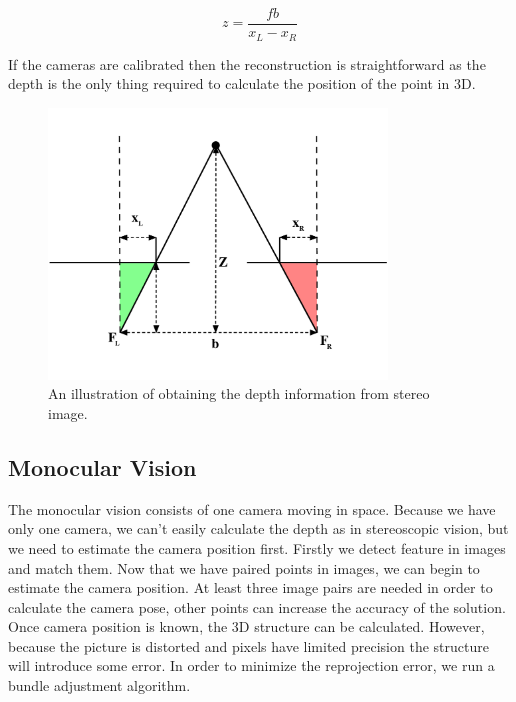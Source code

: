 \begin{equation}
	z=\frac{f b}{x_L - x_R}
\end{equation}

If the cameras are calibrated then the reconstruction is straightforward as the depth is the only thing required to calculate the position of the point in 3D.

\begin{figure}[ht]
	\begin{center}
		\includegraphics[keepaspectratio,width=9cm]{fig/stereo.pdf}
	\end{center}
	\caption{An illustration of obtaining the depth information from stereo image.}
	\label{fig:stereo}
\end{figure}

\subsection*{Monocular Vision}
The monocular vision consists of one camera moving in space. Because we have only one camera, we can't easily calculate the depth as in stereoscopic vision, but we need to estimate the camera position first. Firstly we detect feature in images and match them. Now that we have paired points in images, we can begin to estimate the camera position. At least three image pairs are needed in order to calculate the camera pose, other points can increase the accuracy of the solution. Once camera position is known, the 3D structure can be calculated. However, because the picture is distorted and pixels have limited precision the structure will introduce some error. In order to minimize the reprojection error, we run a bundle adjustment algorithm.


